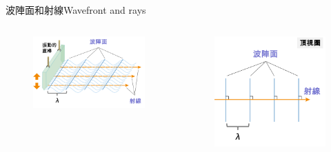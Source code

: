 \documentclass[beamer=true]{standalone}
\begin{document}
\begin{frame}{波陣面和射線Wavefront and rays}
    \begin{columns}
        \begin{figure}
            \centering
            \includegraphics[width=1\linewidth]{images/3.png}


        \end{figure}

        \begin{figure}
            \centering
            \includegraphics[width=1\linewidth]{images/4.png}



\end{figure}
\end{columns}
\end{frame}
\end{document}
